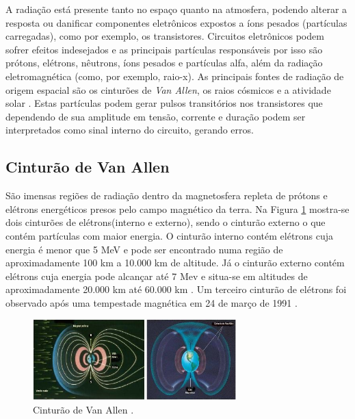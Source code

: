 A radiação está presente tanto no espaço quanto na atmosfera, podendo alterar a resposta ou danificar componentes eletrônicos expostos a íons pesados (partículas carregadas), como por exemplo, os transistores. Circuitos eletrônicos podem sofrer efeitos indesejados e as principais partículas responsáveis por isso são prótons, elétrons, nêutrons, íons pesados e partículas alfa, além da radiação eletromagnética (como, por exemplo, raio-x). As principais fontes de radiação de origem espacial são os cinturões de \textit{Van Allen}, os raios cósmicos \cite{Stassinopoulos:1988} e a atividade solar \cite{Boudenot:2007}. Estas partículas podem gerar pulsos transitórios nos transistores que dependendo de sua amplitude em tensão, corrente e duração podem ser interpretados como sinal interno do circuito, gerando erros. 


\subsection{Cinturão de Van Allen} \label{subsec: cinturao}

São imensas regiões de radiação dentro da magnetosfera repleta de prótons e elétrons energéticos presos pelo campo magnético da terra. Na Figura \ref{Img:cinturaoVanAllen} mostra-se dois cinturões de elétrons(interno e externo), sendo o cinturão externo o que contém partículas com maior energia. O cinturão interno contém elétrons cuja energia é menor que 5 MeV e pode ser encontrado numa região de aproximadamente 100 km a 10.000 km de altitude. Já o cinturão externo contém elétrons cuja energia pode alcançar até 7 Mev e situa-se em altitudes de aproximadamente 20.000 km até 60.000 km \cite{Stassinopoulos:1988}. Um terceiro cinturão de elétrons foi observado após uma tempestade magnética em 24 de março de 1991 \cite{Velazco:2007}.      

\begin{figure}
	\centering
	\includegraphics[width=0.7\textwidth]{figuras/cinturao.jpg}
	\caption[Cinturão de Van Allen]{Cinturão de Van Allen \cite{cinturao}.}
	\label{Img:cinturaoVanAllen}	
\end{figure}

